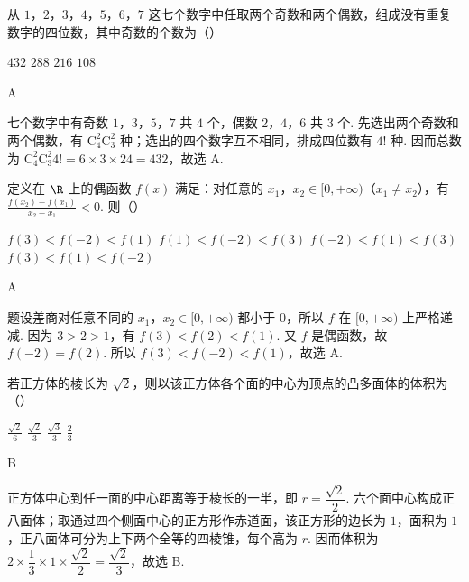 \begin{problem}
从 \(1\)，\(2\)，\(3\)，\(4\)，\(5\)，\(6\)，\(7\) 这七个数字中任取两个奇数和两个偶数，组成没有重复数字的四位数，其中奇数的个数为（\quad）

\choices
    {\(432\)}
    {\(288\)}
    {\(216\)}
    {\(108\)}
\end{problem}

\begin{answer}
A
\end{answer}

\begin{solution}
七个数字中有奇数 \(1\)，\(3\)，\(5\)，\(7\) 共 \(4\) 个，偶数 \(2\)，\(4\)，\(6\) 共 \(3\) 个. 先选出两个奇数和两个偶数，有 \(\mathrm C_{4}^{2}\mathrm C_{3}^{2}\) 种；选出的四个数字互不相同，排成四位数有 \(4!\) 种. 因而总数为 \(\mathrm C_{4}^{2}\mathrm C_{3}^{2}4!=6\times3\times24=432\)，故选 A.
\end{solution}

\begin{problem}
定义在 \(\R\) 上的偶函数 \(f(x)\) 满足：对任意的 \(x_{1}\)，\(x_{2} \in [0, +\infty)\)（\(x_{1} \neq x_{2}\)），有 \(\frac{f(x_2) - f(x_1)}{x_2 - x_1} < 0\). 则（\quad）

\choices
    {\(f(3) < f(-2) < f(1)\)}
    {\(f(1) < f(-2) < f(3)\)}
    {\(f(-2) < f(1) < f(3)\)}
    {\(f(3) < f(1) < f(-2)\)}
\end{problem}

\begin{answer}
A
\end{answer}

\begin{solution}
题设差商对任意不同的 \(x_{1}\)，\(x_{2}\in[0,+\infty)\) 都小于 \(0\)，所以 \(f\) 在 \([0,+\infty)\) 上严格递减. 因为 \(3>2>1\)，有 \(f(3)<f(2)<f(1)\). 又 \(f\) 是偶函数，故 \(f(-2)=f(2)\). 所以 \(f(3)<f(-2)<f(1)\)，故选 A.
\end{solution}

\begin{problem}
若正方体的棱长为 \(\sqrt{2}\)，则以该正方体各个面的中心为顶点的凸多面体的体积为（\quad）

\choices
    {\(\frac{\sqrt{2}}{6}\)}
    {\(\frac{\sqrt{2}}{3}\)}
    {\(\frac{\sqrt{3}}{3}\)}
    {\(\frac{2}{3}\)}
\end{problem}

\begin{answer}
B
\end{answer}

\begin{solution}
正方体中心到任一面的中心距离等于棱长的一半，即 \(r=\dfrac{\sqrt{2}}{2}\). 六个面中心构成正八面体；取通过四个侧面中心的正方形作赤道面，该正方形的边长为 \(1\)，面积为 \(1\)，正八面体可分为上下两个全等的四棱锥，每个高为 \(r\). 因而体积为 \(2\times\dfrac{1}{3}\times1\times\dfrac{\sqrt{2}}{2}=\dfrac{\sqrt{2}}{3}\)，故选 B.
\end{solution}

